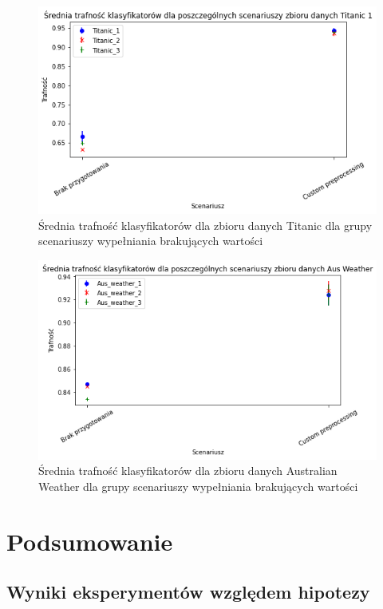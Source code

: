 \documentclass{book}
\begin{document}
\begin{figure}[H]
    \centerline{\includegraphics[scale=0.5]{Titanic_Avg_Custom}}
    \centering
    \caption{Średnia trafność klasyfikatorów dla zbioru danych Titanic 
    dla grupy scenariuszy wypełniania brakujących wartości}
    \end{figure}

\begin{figure}[H]
    \centerline{\includegraphics[scale=0.5]{Aus_Weather_Avg_Custom}}
    \centering
    \caption{Średnia trafność klasyfikatorów dla zbioru danych Australian Weather 
    dla grupy scenariuszy wypełniania brakujących wartości}
    \end{figure}


\chapter{Podsumowanie}

\section{Wyniki eksperymentów względem hipotezy}
\end{document}
